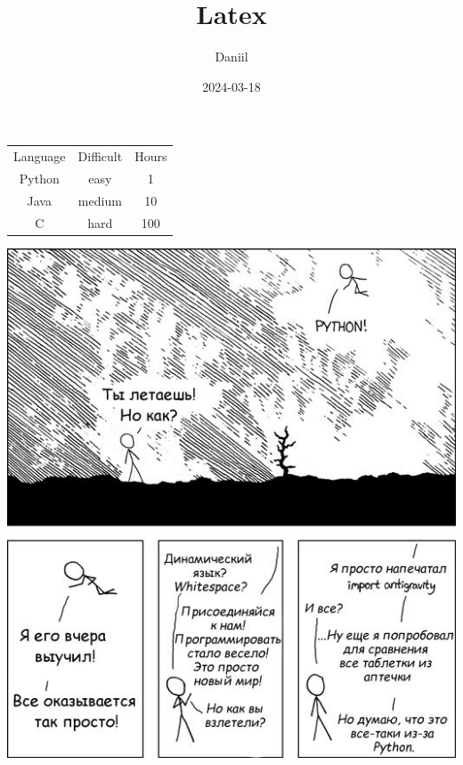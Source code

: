 \documentclass{article}
\title{Latex}
\author{Daniil}
\date{2024-03-18}
\begin{document}
\maketitle

\begin{tabular}{| c | c | c |}
\hline
Language & Difficult & Hours \\
Python & easy & 1 \\
Java & medium & 10 \\
C & hard & 100 \\
\hline
\end{tabular}
\begin{center}\includegraphics[scale=1.5]{artifacts/picture.png}
\end{center}
\end{document}
